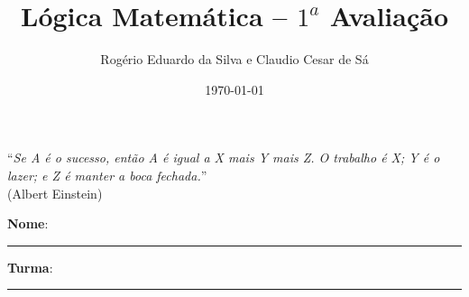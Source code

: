 \documentclass[12pt]{article}
\title{Lógica Matemática -- $1^a$ Avaliação}
\author{Rogério Eduardo da Silva e Claudio Cesar de Sá}
\date{\today}
\begin{document}
\pagestyle{empty}
\maketitle


%


\begin{flushright}
``\textit{Se A é o sucesso, então A é igual a X mais Y mais Z. O trabalho é X; Y é o lazer; e Z é manter a boca fechada.}''\\ (Albert Einstein)
\end{flushright}

\begin{flushleft}
\textbf{Nome}: \rule{10cm}{0.2mm} \textbf{Turma}: \rule{1cm}{0.2mm}
\end{flushleft}
\end{document}
